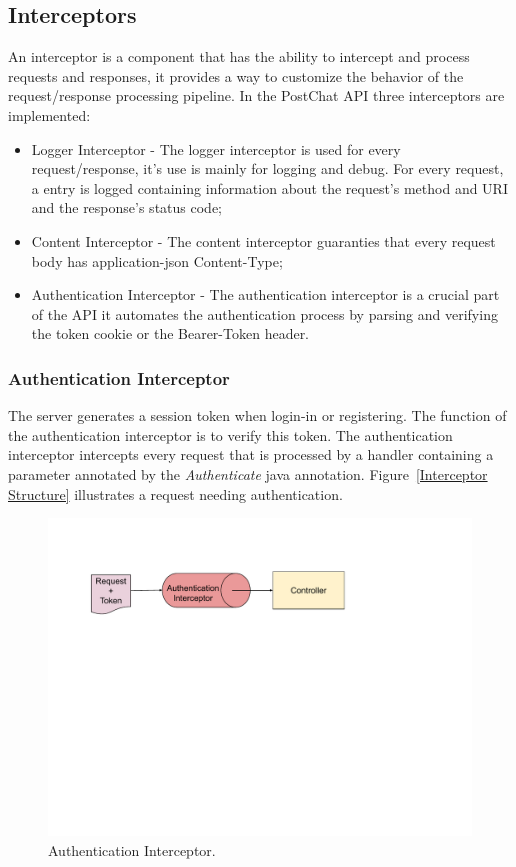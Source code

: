 \subsection{Interceptors}
An interceptor is a component that has the ability to intercept and process requests and responses, it provides a way to customize the behavior of the request/response processing pipeline. In the PostChat API three interceptors are implemented:

\begin{itemize}
        \item Logger Interceptor - The logger interceptor is used for every request/response, it's use is mainly for logging and debug. For every request, a entry is logged containing information about the request's method and URI and the response's status code;
        \item Content Interceptor - The content interceptor guaranties that every request body has application-json Content-Type;
        \item Authentication Interceptor - The authentication interceptor is a crucial part of the API it automates the authentication process by parsing and verifying the token cookie or the Bearer-Token header.
\end{itemize}

\subsubsection{Authentication Interceptor}
The server generates a session token when login-in or registering. The function of the authentication interceptor is to verify this token.
The authentication interceptor intercepts every request that is processed by a handler containing a parameter annotated by the \textit{Authenticate} java annotation.
Figure~\ref{Interceptor Structure} illustrates a request needing authentication.

\begin{figure}[!ht]
	\centering
	\includegraphics[trim={0cm 12cm 5cm 2cm}, width=1\textwidth]{./Chapter4/Figures/Interceptor Structure}
	\caption{Authentication Interceptor.}
	\label{fig:Interceptor Structure}
\end{figure}



